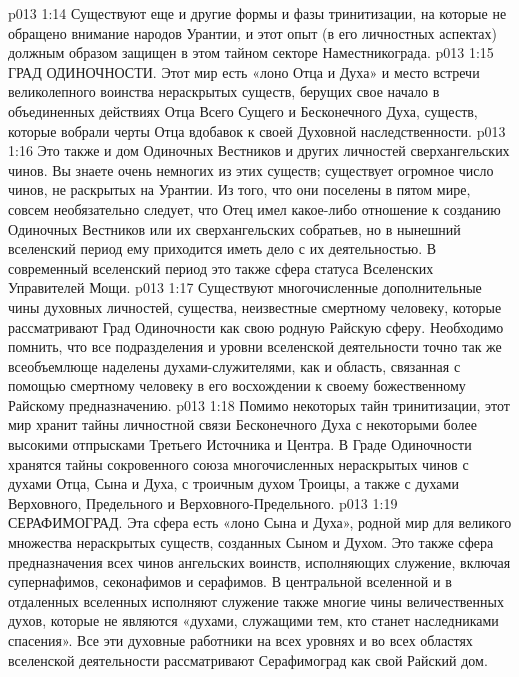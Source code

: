 \vs p013 1:14 Существуют еще и другие формы и фазы тринитизации, на которые не обращено внимание народов Урантии, и этот опыт (в его личностных аспектах) должным образом защищен в этом тайном секторе Наместникограда.
\vs p013 1:15 \bibnobreakspace ГРАД ОДИНОЧНОСТИ. Этот мир есть «лоно Отца и Духа» и место встречи великолепного воинства нераскрытых существ, берущих свое начало в объединенных действиях Отца Всего Сущего и Бесконечного Духа, существ, которые вобрали черты Отца вдобавок к своей Духовной наследственности.
\vs p013 1:16 Это также и дом Одиночных Вестников и других личностей сверхангельских чинов. Вы знаете очень немногих из этих существ; существует огромное число чинов, не раскрытых на Урантии. Из того, что они поселены в пятом мире, совсем необязательно следует, что Отец имел какое\hyp{}либо отношение к созданию Одиночных Вестников или их сверхангельских собратьев, но в нынешний вселенский период ему приходится иметь дело с их деятельностью. В современный вселенский период это также сфера статуса Вселенских Управителей Мощи.
\vs p013 1:17 Существуют многочисленные дополнительные чины духовных личностей, существа, неизвестные смертному человеку, которые рассматривают Град Одиночности как свою родную Райскую сферу. Необходимо помнить, что все подразделения и уровни вселенской деятельности точно так же всеобъемлюще наделены духами\hyp{}служителями, как и область, связанная с помощью смертному человеку в его восхождении к своему божественному Райскому предназначению.
\vs p013 1:18 \pc {} Помимо некоторых тайн тринитизации, этот мир хранит тайны личностной связи Бесконечного Духа с некоторыми более высокими отпрысками Третьего Источника и Центра. В Граде Одиночности хранятся тайны сокровенного союза многочисленных нераскрытых чинов с духами Отца, Сына и Духа, с троичным духом Троицы, а также с духами Верховного, Предельного и Верховного\hyp{}Предельного.
\vs p013 1:19 \bibnobreakspace СЕРАФИМОГРАД. Эта сфера есть «лоно Сына и Духа», родной мир для великого множества нераскрытых существ, созданных Сыном и Духом. Это также сфера предназначения всех чинов ангельских воинств, исполняющих служение, включая супернафимов, секонафимов и серафимов. В центральной вселенной и в отдаленных вселенных исполняют служение также многие чины величественных духов, которые не являются «духами, служащими тем, кто станет наследниками спасения». Все эти духовные работники на всех уровнях и во всех областях вселенской деятельности рассматривают Серафимоград как свой Райский дом.
